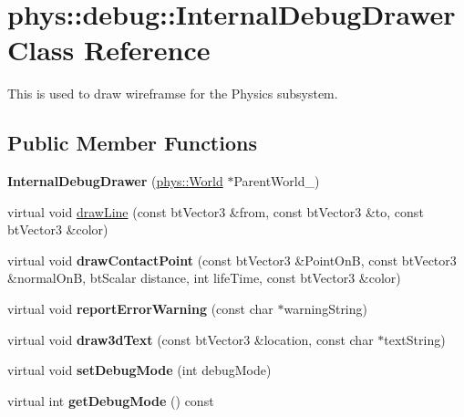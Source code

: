 \hypertarget{classphys_1_1debug_1_1InternalDebugDrawer}{
\section{phys::debug::InternalDebugDrawer Class Reference}
\label{db/d27/classphys_1_1debug_1_1InternalDebugDrawer}
}


This is used to draw wireframse for the Physics subsystem.  


\subsection*{Public Member Functions}
\begin{DoxyCompactItemize}
\item 
\hypertarget{classphys_1_1debug_1_1InternalDebugDrawer_a323f6fa6e2979e989d0096bf3a304198}{
{\bfseries InternalDebugDrawer} (\hyperlink{classphys_1_1World}{phys::World} $\ast$ParentWorld\_\-)}
\label{db/d27/classphys_1_1debug_1_1InternalDebugDrawer_a323f6fa6e2979e989d0096bf3a304198}

\item 
virtual void \hyperlink{classphys_1_1debug_1_1InternalDebugDrawer_a8a35c3c80fddaaec8e21f737ed1b3938}{drawLine} (const btVector3 \&from, const btVector3 \&to, const btVector3 \&color)
\item 
\hypertarget{classphys_1_1debug_1_1InternalDebugDrawer_a8b912aaff8dfd9f4e97ffb2d867121b2}{
virtual void {\bfseries drawContactPoint} (const btVector3 \&PointOnB, const btVector3 \&normalOnB, btScalar distance, int lifeTime, const btVector3 \&color)}
\label{db/d27/classphys_1_1debug_1_1InternalDebugDrawer_a8b912aaff8dfd9f4e97ffb2d867121b2}

\item 
\hypertarget{classphys_1_1debug_1_1InternalDebugDrawer_a4e3b4cbc861f76696b4d32f0cf068ea6}{
virtual void {\bfseries reportErrorWarning} (const char $\ast$warningString)}
\label{db/d27/classphys_1_1debug_1_1InternalDebugDrawer_a4e3b4cbc861f76696b4d32f0cf068ea6}

\item 
\hypertarget{classphys_1_1debug_1_1InternalDebugDrawer_a1266d3fad8868ade2d515e9c92e76b4a}{
virtual void {\bfseries draw3dText} (const btVector3 \&location, const char $\ast$textString)}
\label{db/d27/classphys_1_1debug_1_1InternalDebugDrawer_a1266d3fad8868ade2d515e9c92e76b4a}

\item 
\hypertarget{classphys_1_1debug_1_1InternalDebugDrawer_a63059b273ed6031a393b2d994b820bcc}{
virtual void {\bfseries setDebugMode} (int debugMode)}
\label{db/d27/classphys_1_1debug_1_1InternalDebugDrawer_a63059b273ed6031a393b2d994b820bcc}

\item 
\hypertarget{classphys_1_1debug_1_1InternalDebugDrawer_aba329861569d741e970ce5aafb668e84}{
virtual int {\bfseries getDebugMode} () const }
\label{db/d27/classphys_1_1debug_1_1InternalDebugDrawer_aba329861569d741e970ce5aafb668e84}

\end{DoxyCompactItemize}


